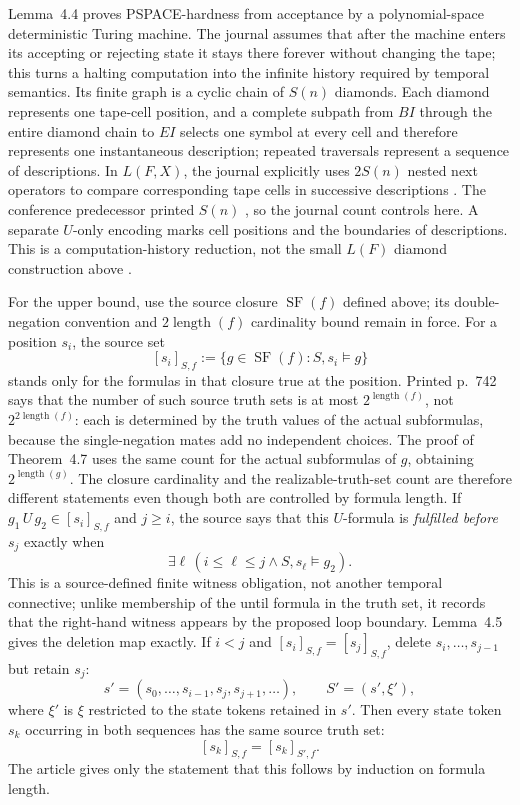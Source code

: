 Lemma~4.4 proves PSPACE-hardness from acceptance by a polynomial-space
deterministic Turing machine.  The journal assumes that after the machine
enters its accepting or rejecting state it stays there forever without changing
the tape; this turns a halting computation into the infinite history required
by temporal semantics.  Its finite graph is a cyclic chain of \(S(n)\)
diamonds.  Each diamond represents one tape-cell position, and a complete
subpath from \(BI\) through the entire diamond chain to \(EI\) selects one
symbol at every cell and therefore represents one instantaneous description;
repeated traversals represent a sequence of descriptions.  In
\(L(F,X)\), the journal explicitly uses \(2S(n)\) nested next operators to
compare corresponding tape cells in successive descriptions
\cite[p.~741]{SistlaClarke1985}.  The conference predecessor printed \(S(n)\)
\cite[p.~164]{SistlaClarke1982}, so the journal count controls here.  A
separate \(U\)-only encoding marks cell positions and the boundaries of
descriptions.
This is a computation-history reduction, not the small \(L(F)\) diamond
construction above
\cite[pp.~741--742]{SistlaClarke1985}.

For the upper bound, use the source closure \(\operatorname{SF}(f)\) defined
above; its double-negation convention and
\(2\operatorname{length}(f)\) cardinality bound remain in force.  For a
position \(s_i\), the source set
\[
 [s_i]_{S,f}:=\{g\in\operatorname{SF}(f):S,s_i\models g\}
\]
stands only for the formulas in that closure true at the position.  Printed
p.~742 says that the number of such source truth sets is at most
\(2^{\operatorname{length}(f)}\), not
\(2^{2\operatorname{length}(f)}\): each is determined by the truth values of
the actual subformulas, because the single-negation mates add no independent
choices.  The proof of Theorem~4.7 uses the same count for the actual
subformulas of \(g\), obtaining \(2^{\operatorname{length}(g)}\).  The closure
cardinality and the realizable-truth-set count are therefore different
statements even though both are controlled by formula length.  If
\(g_1\,U\,g_2\in[s_i]_{S,f}\) and \(j\ge i\), the source says that this
\(U\)-formula is \emph{fulfilled before} \(s_j\) exactly when
\[
 \exists \ell\,(i\le \ell\le j\land S,s_\ell\models g_2).
\]
This is a source-defined finite witness obligation, not another temporal
connective; unlike membership of the until formula in the truth set, it
records that the right-hand witness appears by the proposed loop boundary.
Lemma~4.5 gives the deletion map exactly.  If \(i<j\) and
\([s_i]_{S,f}=[s_j]_{S,f}\), delete \(s_i,\ldots,s_{j-1}\) but retain
\(s_j\):
\[
 s'=(s_0,\ldots,s_{i-1},s_j,s_{j+1},\ldots),
 \qquad S'=(s',\xi'),
\]
where \(\xi'\) is \(\xi\) restricted to the state tokens retained in \(s'\).
Then every state token \(s_k\) occurring in both sequences has the same
source truth set:
\[
 [s_k]_{S,f}=[s_k]_{S',f}.
\]
The article gives only the statement that this follows by induction on
formula length.

